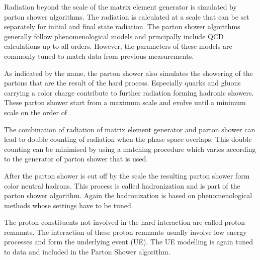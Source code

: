 Radiation beyond the scale of the matrix element generator is simulated by parton shower algorithms.
The radiation is calculated at a scale that can be set separately for initial and final state radiation. 
The parton shower algorithms generally follow phenomenological models and principally include QCD calculations up to all orders.
However, the parameters of these models are commonly tuned to match data from previous measurements.

As indicated by the name, the parton shower also simulates the showering of the partons that are the result of the hard process.
Especially quarks and gluons carrying a color charge contribute to further radiation forming hadronic showers.
These parton shower start from a maximum scale and evolve until a minimum scale on the order of \GeV. 

The combination of radiation of matrix element generator and parton shower can lead to double counting of radiation when the phase space overlaps.
This double counting can be minimised by using a matching procedure which varies according to the generator of parton shower that is used.

After the parton shower is cut off by the scale the resulting parton shower form color neutral hadrons.
This process is called hadronization and is part of the parton shower algorithm.
Again the hadronization is based on phenomenological methods whose settings have to be tuned.

The proton constituents not involved in the hard interaction are called proton remnants. The interaction of these proton remnants usually involve low energy processes and form the underlying
event (UE). The UE modelling is again tuned to data and included in the Parton Shower algorithm.

